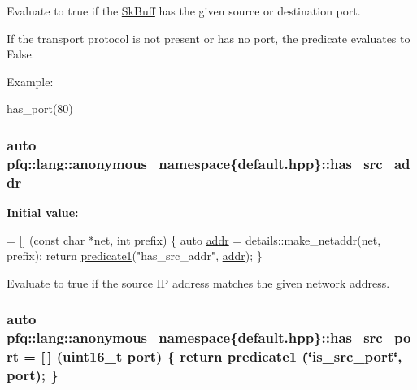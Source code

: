 Evaluate to {\ttfamily true} if the \hyperlink{structpfq_1_1lang_1_1SkBuff}{Sk\+Buff} has the given source or destination port. 

If the transport protocol is not present or has no port, the predicate evaluates to False.

Example\+:

has\+\_\+port(80) \hypertarget{namespacepfq_1_1lang_1_1anonymous__namespace_02default_8hpp_03_acb03dd3e34d6dd7e83d621fa9077194c}{
\subsubsection[{has\+\_\+src\+\_\+addr}]{\setlength{\rightskip}{0pt plus 5cm}auto pfq\+::lang\+::anonymous\+\_\+namespace\{default.\+hpp\}\+::has\+\_\+src\+\_\+addr}}\label{namespacepfq_1_1lang_1_1anonymous__namespace_02default_8hpp_03_acb03dd3e34d6dd7e83d621fa9077194c}
{\bfseries Initial value\+:}
\begin{DoxyCode}
= [] (\textcolor{keyword}{const} \textcolor{keywordtype}{char} *net, \textcolor{keywordtype}{int} prefix)
        \{
            \textcolor{keyword}{auto} \hyperlink{namespacepfq_1_1lang_1_1anonymous__namespace_02default_8hpp_03_a13cabe468839119d8d68540e3c60718b}{addr} = details::make\_netaddr(net, prefix);
            \textcolor{keywordflow}{return} \hyperlink{namespacepfq_1_1lang_a3e018f096545ca95a68e67027c8e3144}{predicate1}(\textcolor{stringliteral}{"has\_src\_addr"}, \hyperlink{namespacepfq_1_1lang_1_1anonymous__namespace_02default_8hpp_03_a13cabe468839119d8d68540e3c60718b}{addr});
        \}
\end{DoxyCode}


Evaluate to {\ttfamily true} if the source I\+P address matches the given network address. 

\hypertarget{namespacepfq_1_1lang_1_1anonymous__namespace_02default_8hpp_03_a964d5ed41f50a1f3a04176f8e54d7a5a}{
\subsubsection[{has\+\_\+src\+\_\+port}]{\setlength{\rightskip}{0pt plus 5cm}auto pfq\+::lang\+::anonymous\+\_\+namespace\{default.\+hpp\}\+::has\+\_\+src\+\_\+port = \mbox{[}$\,$\mbox{]} (uint16\+\_\+t {\bf port}) \{ return {\bf predicate1} (\char`\"{}is\+\_\+src\+\_\+port\char`\"{}, port); \}}}\label{namespacepfq_1_1lang_1_1anonymous__namespace_02default_8hpp_03_a964d5ed41f50a1f3a04176f8e54d7a5a}


